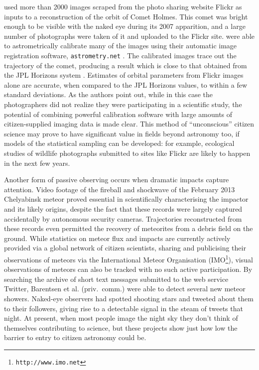 \documentclass{ar2e}
\def\url#1{\texttt{#1}}
\begin{document}
\citet{Lang++2012} used more than 2000 images scraped from the photo sharing
website Flickr as inputs to a reconstruction of the orbit of Comet Holmes. This
comet was bright enough to be visible with the naked eye during its 2007
apparition, and a large number of photographs were taken of it and uploaded to
the Flickr site. \citeauthor{Lang++2012} were able to astrometrically calibrate
many of the images using their automatic image registration software,
\texttt{astrometry.net} \citep{Lang++2010}. The calibrated images trace out the trajectory of the comet,
producing a result which is close to that obtained from the JPL Horizons system
\citep{Giorgini}. Estimates of orbital parameters from Flickr images alone are
accurate, when compared to the JPL Horizons values, to within a few standard
deviations. As the authors point out, while in this case the photographers did
not realize they were participating in a scientific study, the potential of
combining powerful calibration software with large amounts of citizen-supplied
imaging data is made clear. This method of ``unconscious'' citizen science may
prove to have significant value in fields beyond astronomy too, if models of the
statistical sampling can be developed: for example, 
ecological studies of wildlife photographs
submitted to sites like Flickr are likely to happen in the next few years. 


Another form of passive observing occurs when dramatic impacts capture attention. Video footage of
the fireball and shockwave of the February 2013 Chelyabinsk meteor
\citep{13popova} proved essential in scientifically characterising the impactor and
its likely origins, despite the fact that these records were largely captured
accidentally by autonomous security cameras.  Trajectories reconstructed from
these records even permitted the recovery of meteorites from a debris field on
the ground.  
While statistics on meteor flux and impacts are currently actively provided via a global
network of citizen scientists, sharing and publicising their observations of
meteors via the International Meteor Organisation
(IMO\footnote{\url{http://www.imo.net}}), visual observations of
meteors can also be tracked with no such active participation. By searching the
archive of short text messages submitted to the web service Twitter, Barentsen
et al. (priv.\ comm.) were able to detect several new meteor showers. Naked-eye
observers had spotted shooting stars and tweeted about them to their followers,
giving rise to a detectable signal in the steam of tweets that night. 
At present, when most 
people image the night sky they don't think of themselves contributing to
science, but these projects show just how low the barrier to entry to citizen
astronomy could be.
\end{document}
